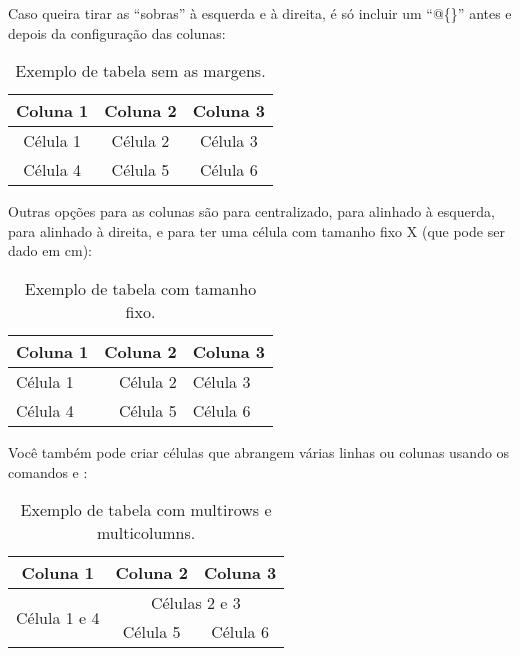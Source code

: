         Caso queira tirar as ``sobras'' à esquerda e à direita, é só incluir um ``@\{\}'' antes e depois da configuração das colunas:
        \begin{table}[h!]
          \centering
          \caption{Exemplo de tabela sem as margens.}
          \label{tab:ex_2}
          \begin{tabular}{@{}ccc@{}}
            \toprule
            \textbf{Coluna 1} & \textbf{Coluna 2} & \textbf{Coluna 3} \\ \midrule
            Célula 1          & Célula 2          & Célula 3          \\ 
            Célula 4          & Célula 5          & Célula 6          \\ 
            \bottomrule
          \end{tabular}
        \end{table}

        Outras opções para as colunas são  para centralizado,  para alinhado à esquerda,  para alinhado à direita, e  para ter uma célula com tamanho fixo X (que pode ser dado em cm):
        \begin{table}[h!]
          \centering
          \caption{Exemplo de tabela com tamanho fixo.}
          \label{tab:ex_3}
          \begin{tabular}{@{}lrp{5cm}@{}}
            \toprule
            \textbf{Coluna 1} & \textbf{Coluna 2} & \textbf{Coluna 3} \\ \midrule
            Célula 1          & Célula 2          & Célula 3          \\ 
            Célula 4          & Célula 5          & Célula 6          \\ 
            \bottomrule
          \end{tabular}
        \end{table}

        Você também pode criar células que abrangem várias linhas ou colunas usando os comandos  e :
        \begin{table}[h!]
          \centering
          \caption{Exemplo de tabela com multirows e multicolumns.}
          \label{tab:ex_4}
          \begin{tabular}{@{}ccc@{}}
            \toprule
            \textbf{Coluna 1}             & \textbf{Coluna 2} & \textbf{Coluna 3} \\ \midrule
            \multirow{2}{*}{Célula 1 e 4} & \multicolumn{2}{c}{Células 2 e 3}     \\ 
                                          & Célula 5          & Célula 6          \\ 
            \bottomrule
          \end{tabular}
        \end{table}

